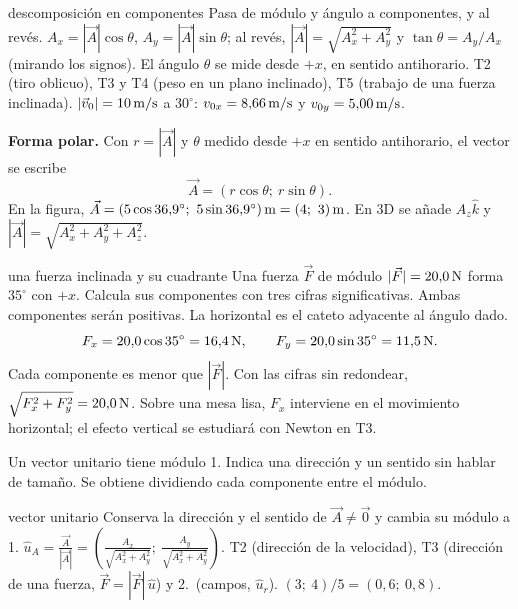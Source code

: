 \documentclass[11pt,a4paper]{article}
\begin{document}
\begin{toolbox}{descomposici\'on en componentes}
 Pasa de m\'odulo y \'angulo a componentes, y al rev\'es.
 \mbox{$A_x=|\vec A|\cos\theta$}, \mbox{$A_y=|\vec A|\sin\theta$};
al rev\'es, \mbox{$|\vec A|=\sqrt{A_x^2+A_y^2}$} y \mbox{$\tan\theta=A_y/A_x$}
(mirando los signos). El \'angulo $\theta$ se mide desde $+x$, en sentido antihorario.
 T2 (tiro oblicuo), T3 y T4 (peso en un plano inclinado),
T5 (trabajo de una fuerza inclinada).
 $|\vec v_0|=10\,\mathrm{m/s}$ a $30^\circ$: $v_{0x}=8{,}66\,\mathrm{m/s}$ y
$v_{0y}=5{,}00\,\mathrm{m/s}$.
\end{toolbox}

\textbf{Forma polar.} Con $r=|\vec A|$ y $\theta$ medido desde $+x$ en sentido
antihorario, el vector se escribe
\[
\vec A=(r\cos\theta;\ r\sin\theta).
\]
En la figura, $\vec A=(5\cos36{,}9^\circ;\ 5\sin36{,}9^\circ)\units{m}=(4;\ 3)\units{m}$.
En 3D se a\~nade $A_z\hat k$ y $|\vec A|=\sqrt{A_x^2+A_y^2+A_z^2}$.

\begin{examplebox}{una fuerza inclinada y su cuadrante}
 Una fuerza $\vec F$ de m\'odulo $|\vec F|=20{,}0\,\mathrm{N}$ forma
$35^\circ$ con $+x$. Calcula sus componentes con tres cifras significativas.
\solutionblock
{} Ambas componentes ser\'an positivas. La horizontal es el cateto
adyacente al \'angulo dado.
\[
F_x=20{,}0\cos35^\circ=16{,}4\,\mathrm{N},\qquad
F_y=20{,}0\sin35^\circ=11{,}5\,\mathrm{N}.
\]
 Cada componente es menor que $|\vec F|$.
Con las cifras sin redondear, $\sqrt{F_x^2+F_y^2}=20{,}0\,\mathrm{N}$.
Sobre una mesa lisa, $F_x$ interviene en el movimiento horizontal;
el efecto vertical se estudiar\'a con Newton en T3.
\end{examplebox}

Un vector unitario tiene m\'odulo 1. Indica una direcci\'on y un sentido sin hablar
de tama\~no. Se obtiene dividiendo cada componente entre el m\'odulo.

\begin{toolbox}{vector unitario}
 Conserva la direcci\'on y el sentido de $\vec A\ne\vec 0$ y
cambia su m\'odulo a 1.
$\displaystyle\hat u_A=\frac{\vec A}{|\vec A|}
=\left(\frac{A_x}{\sqrt{A_x^2+A_y^2}};\ \frac{A_y}{\sqrt{A_x^2+A_y^2}}\right)$.
 T2 (direcci\'on de la velocidad), T3 (direcci\'on de una
fuerza, $\vec F=|\vec F|\,\hat u$) y 2.\textordmasculine\ (campos, $\hat u_r$).
 $(3;\ 4)/5=(0{,}6;\ 0{,}8)$.
\end{toolbox}
\end{document}
